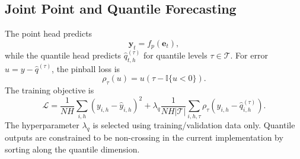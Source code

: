 \subsection{Joint Point and Quantile Forecasting}
The point head predicts
\begin{equation}
\hat{\mathbf{y}}_t=f_{p}(\mathbf{e}_t),
\end{equation}
while the quantile head predicts $\hat{q}_{t,h}^{(\tau)}$ for quantile levels $\tau\in\mathcal{T}$. For error $u=y-\hat{q}^{(\tau)}$, the pinball loss is
\begin{equation}
\rho_{\tau}(u)=u\left(\tau-\mathbb{I}\{u<0\}\right).
\end{equation}
The training objective is
\begin{equation}
\mathcal{L}=\frac{1}{NH}\sum_{i,h}(y_{i,h}-\hat{y}_{i,h})^2+
\lambda_q\frac{1}{NH|\mathcal{T}|}\sum_{i,h,\tau}\rho_{\tau}\left(y_{i,h}-\hat{q}_{i,h}^{(\tau)}\right).
\label{eq:jointloss}
\end{equation}
The hyperparameter $\lambda_q$ is selected using training/validation data only. Quantile outputs are constrained to be non-crossing in the current implementation by sorting along the quantile dimension.

